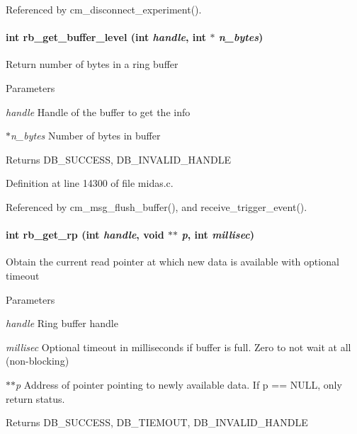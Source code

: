 Referenced by cm\_\-disconnect\_\-experiment().
\paragraph[{rb\_\-get\_\-buffer\_\-level}]{\setlength{\rightskip}{0pt plus 5cm}int rb\_\-get\_\-buffer\_\-level (int {\em handle}, \/  int $\ast$ {\em n\_\-bytes})}\hfill\label{group__rbfunctionc_gae92c348180d666240c295b7c334b4ebe}
Return number of bytes in a ring buffer


\begin{DoxyParams}{Parameters}
\item[{\em handle}]Handle of the buffer to get the info \item[{\em $\ast$n\_\-bytes}]Number of bytes in buffer \end{DoxyParams}
\begin{DoxyReturn}{Returns}
DB\_\-SUCCESS, DB\_\-INVALID\_\-HANDLE 
\end{DoxyReturn}


Definition at line 14300 of file midas.c.

Referenced by cm\_\-msg\_\-flush\_\-buffer(), and receive\_\-trigger\_\-event().
\paragraph[{rb\_\-get\_\-rp}]{\setlength{\rightskip}{0pt plus 5cm}int rb\_\-get\_\-rp (int {\em handle}, \/  void $\ast$$\ast$ {\em p}, \/  int {\em millisec})}\hfill\label{group__rbfunctionc_ga0335381f2ef26fd5251bc7b30d6d1e90}
Obtain the current read pointer at which new data is available with optional timeout


\begin{DoxyParams}{Parameters}
\item[{\em handle}]Ring buffer handle \item[{\em millisec}]Optional timeout in milliseconds if buffer is full. Zero to not wait at all (non-\/blocking)\item[{\em $\ast$$\ast$p}]Address of pointer pointing to newly available data. If p == NULL, only return status. \end{DoxyParams}
\begin{DoxyReturn}{Returns}
DB\_\-SUCCESS, DB\_\-TIEMOUT, DB\_\-INVALID\_\-HANDLE 
\end{DoxyReturn}



